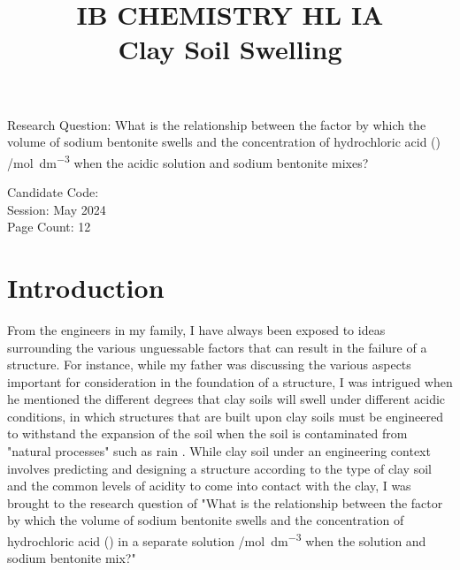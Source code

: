 \documentclass[11pt, letterpaper]{article}
\title{IB CHEMISTRY HL IA
\\
Clay Soil Swelling}
\author{}
\date{}
\begin{document}
\nocite{*}

\maketitle

\begin{center}
    Research Question: What is the relationship between
    the factor by which the volume of
    sodium bentonite swells and the concentration of hydrochloric acid () /\unit{mol.dm^{-3}} when the acidic solution and sodium bentonite
    mixes?
    \\
\end{center}

\begin{center}
    Candidate Code:
    \\
    Session: May 2024
    \\
    Page Count: 12
\end{center}
\newpage

\tableofcontents
\newpage


\section{Introduction}

\setcounter{page}{1}

From the engineers in my family, I have always been exposed to ideas
surrounding the various unguessable factors that can
result in the failure of a structure.
For instance, while my father was discussing the various
aspects important for consideration in the foundation
of a structure, I was intrigued when he mentioned the different
degrees that clay soils will swell under different acidic conditions,
in which structures that are built upon clay soils must
be engineered to withstand the expansion of the soil
when the soil is contaminated from "natural processes" such
as rain \cite{ramavaraprasadSwellingCharacteristicsSoils2018a}.
While clay soil under an engineering context involves
predicting and designing a structure according to the
type of clay soil and the common levels of acidity
to come into contact with the clay, I was brought to the
research question of "What is the relationship between
the factor by which the volume of
sodium bentonite swells and the concentration of hydrochloric acid ()
in a separate solution /\unit{mol.dm^{-3}} when the  solution and sodium bentonite
mix?"
\end{document}
